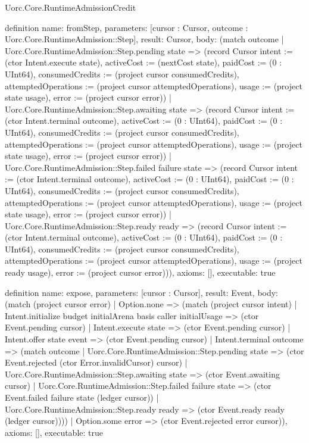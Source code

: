 \begin{lexlean}{Uorc.Core.RuntimeAdmissionCredit}
\begin{semanticmodule}
definition{
  name: fromStep,
  parameters: [cursor : Cursor, outcome : Uorc.Core.RuntimeAdmission::Step],
  result: Cursor,
  body: (match outcome
    | Uorc.Core.RuntimeAdmission::Step.pending state => (record Cursor {intent := (ctor Intent.execute state), activeCost := (nextCost state), paidCost := (0 : UInt64), consumedCredits := (project cursor consumedCredits), attemptedOperations := (project cursor attemptedOperations), usage := (project state usage), error := (project cursor error)})
    | Uorc.Core.RuntimeAdmission::Step.awaiting state => (record Cursor {intent := (ctor Intent.terminal outcome), activeCost := (0 : UInt64), paidCost := (0 : UInt64), consumedCredits := (project cursor consumedCredits), attemptedOperations := (project cursor attemptedOperations), usage := (project state usage), error := (project cursor error)})
    | Uorc.Core.RuntimeAdmission::Step.failed failure state => (record Cursor {intent := (ctor Intent.terminal outcome), activeCost := (0 : UInt64), paidCost := (0 : UInt64), consumedCredits := (project cursor consumedCredits), attemptedOperations := (project cursor attemptedOperations), usage := (project state usage), error := (project cursor error)})
    | Uorc.Core.RuntimeAdmission::Step.ready ready => (record Cursor {intent := (ctor Intent.terminal outcome), activeCost := (0 : UInt64), paidCost := (0 : UInt64), consumedCredits := (project cursor consumedCredits), attemptedOperations := (project cursor attemptedOperations), usage := (project ready usage), error := (project cursor error)})),
  axioms: [],
  executable: true
}

definition{
  name: expose,
  parameters: [cursor : Cursor],
  result: Event,
  body: (match (project cursor error)
    | Option.none => (match (project cursor intent)
      | Intent.initialize budget initialArena basis caller initialUsage => (ctor Event.pending cursor)
      | Intent.execute state => (ctor Event.pending cursor)
      | Intent.offer state event => (ctor Event.pending cursor)
      | Intent.terminal outcome => (match outcome
        | Uorc.Core.RuntimeAdmission::Step.pending state => (ctor Event.rejected (ctor Error.invalidCursor) cursor)
        | Uorc.Core.RuntimeAdmission::Step.awaiting state => (ctor Event.awaiting cursor)
        | Uorc.Core.RuntimeAdmission::Step.failed failure state => (ctor Event.failed failure state (ledger cursor))
        | Uorc.Core.RuntimeAdmission::Step.ready ready => (ctor Event.ready ready (ledger cursor))))
    | Option.some error => (ctor Event.rejected error cursor)),
  axioms: [],
  executable: true
}


\end{semanticmodule}
\end{lexlean}
